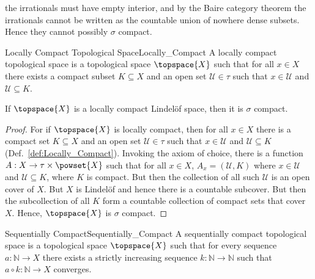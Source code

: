 \documentclass{article}                                                        %
\begin{document}
            the irrationals must have empty interior, and by the Baire category
            theorem the irrationals cannot be written as the countable union of
            nowhere dense subsets. Hence they cannot possibly $\sigma$ compact.
            \begin{fdefinition}{Locally Compact Topological Space}{Locally_Compact}
                A locally compact topological space is a topological space
                $\topspace{X}$ such that for all $x\in{X}$ there exists a compact
                subset $K\subseteq{X}$ and an open set $\mathcal{U}\in\tau$ such
                that $x\in\mathcal{U}$ and $\mathcal{U}\subseteq{K}$.
            \end{fdefinition}
            \begin{theorem}
                \label{thm:Loc_Comp_and_Lindelof_Implies_Sigma_Comp}%
                If $\topspace{X}$ is a locally compact Lindel\"{o}f space, then it
                is $\sigma$ compact.
            \end{theorem}
            \begin{proof}
                For if $\topspace{X}$ is locally compact, then for all $x\in{X}$
                there is a compact set $K\subseteq{X}$ and an open set
                $\mathcal{U}\in\tau$ such that $x\in\mathcal{U}$ and
                $\mathcal{U}\subseteq{K}$ (Def.~\ref{def:Locally_Compact}). Invoking
                the axiom of choice, there is a function
                $A:X\rightarrow\tau\times\powset{X}$ such that for all $x\in{X}$,
                $A_{x}=(\mathcal{U},K)$ where $x\in\mathcal{U}$ and
                $\mathcal{U}\subseteq{K}$, where $K$ is compact. But then the
                collection of all such $\mathcal{U}$ is an open cover of $X$. But
                $X$ is Lindel\"{o}f and hence there is a countable subcover. But
                then the subcollection of all $K$ form a countable collection of
                compact sets that cover $X$. Hence, $\topspace{X}$ is $\sigma$
                compact.
            \end{proof}
            \begin{fdefinition}{Sequentially Compact}{Sequentially_Compact}
                A sequentially compact topological space is a topological space
                $\topspace{X}$ such that for every sequence
                $a:\mathbb{N}\rightarrow{X}$ there exists a strictly increasing
                sequence $k:\mathbb{N}\rightarrow\mathbb{N}$ such that
                $a\circ{k}:\mathbb{N}\rightarrow{X}$ converges.
            \end{fdefinition}
\end{document}
